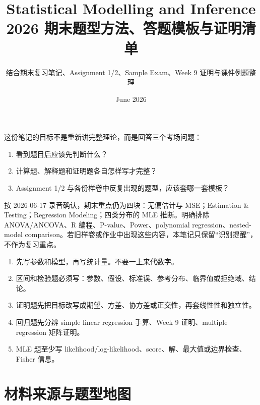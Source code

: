\documentclass[11pt,a4paper]{article}
\title{\textbf{Statistical Modelling and Inference}\\[0.3em]
2026 期末题型方法、答题模板与证明清单}
\author{结合期末复习笔记、Assignment 1/2、Sample Exam、Week 9 证明与课件例题整理}
\date{June 2026}
\begin{document}
\maketitle

\begin{scopebox}[使用说明]
这份笔记的目标不是重新讲完整理论，而是回答三个考场问题：
\begin{enumerate}
  \item 看到题目后应该先判断什么？
  \item 计算题、解释题和证明题各自怎样写才完整？
  \item Assignment 1/2 与各份样卷中反复出现的题型，应该套哪一套模板？
\end{enumerate}

按 2026-06-17 录音确认，期末重点仍为四块：无偏估计与 MSE；Estimation \& Testing；Regression Modeling；四类分布的 MLE 推断。明确排除 ANOVA/ANCOVA、R 编程、P-value、Power、polynomial regression、nested-model comparison。若旧样卷或作业中出现这些内容，本笔记只保留“识别提醒”，不作为复习重点。
\end{scopebox}

\begin{memorybox}[考场总原则]
\begin{enumerate}
  \item 先写参数和模型，再写统计量。不要一上来代数字。
  \item 区间和检验题必须写：参数、假设、标准误、参考分布、临界值或拒绝域、结论。
  \item 证明题先把目标改写成期望、方差、协方差或正交性，再套线性性和独立性。
  \item 回归题先分辨 simple linear regression 手算、Week 9 证明、multiple regression 矩阵证明。
  \item MLE 题至少写 likelihood/log-likelihood、score、解、最大值或边界检查、Fisher 信息。
\end{enumerate}
\end{memorybox}

\tableofcontents
\newpage

\section{材料来源与题型地图}
\end{document}
